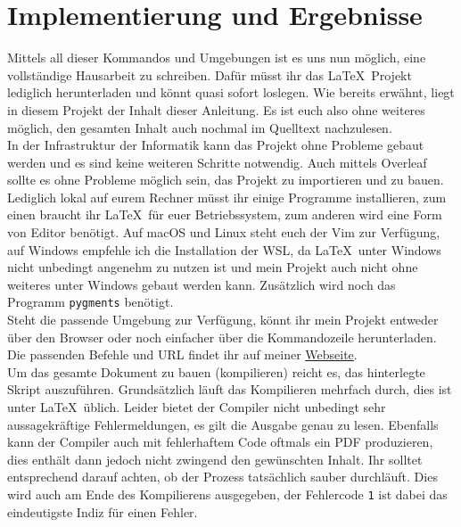 \section{Implementierung und Ergebnisse}

Mittels all dieser Kommandos und Umgebungen ist es uns nun möglich, eine
vollständige Hausarbeit zu schreiben. Dafür müsst ihr das \LaTeX~Projekt 
lediglich herunterladen und könnt quasi sofort loslegen. Wie bereits erwähnt,
liegt in diesem Projekt der Inhalt dieser Anleitung. Es ist euch also ohne 
weiteres möglich, den gesamten Inhalt auch nochmal im Quelltext nachzulesen.\\
In der Infrastruktur der Informatik kann das Projekt ohne Probleme gebaut 
werden und es sind keine weiteren Schritte notwendig. Auch mittels Overleaf
sollte es ohne Probleme möglich sein, das Projekt zu importieren und zu bauen. 
Lediglich lokal auf eurem Rechner müsst ihr einige Programme installieren, zum 
einen braucht ihr \LaTeX~für euer Betriebssystem, zum anderen wird eine Form 
von Editor benötigt. Auf macOS und Linux steht euch der Vim zur Verfügung, auf
Windows empfehle ich die Installation der WSL, da \LaTeX~unter Windows nicht 
unbedingt angenehm zu nutzen ist und mein Projekt auch nicht ohne weiteres unter
Windows gebaut werden kann. Zusätzlich wird noch das Programm \texttt{pygments} 
benötigt.\\
Steht die passende Umgebung zur Verfügung, könnt ihr mein Projekt entweder über 
den Browser oder noch einfacher über die Kommandozeile herunterladen. Die passenden
Befehle und URL findet ihr auf meiner 
\href{https://informatik.hs-bremerhaven.de/flignitz/latex.html}{Webseite}.\\
Um das gesamte Dokument zu bauen (kompilieren) reicht es, das hinterlegte Skript
auszuführen. Grundsätzlich läuft das Kompilieren mehrfach durch, dies ist unter 
\LaTeX~üblich. Leider bietet der Compiler nicht unbedingt sehr aussagekräftige 
Fehlermeldungen, es gilt die Ausgabe genau zu lesen. Ebenfalls kann der Compiler auch
mit fehlerhaftem Code oftmals ein PDF produzieren, dies enthält dann jedoch nicht 
zwingend den gewünschten Inhalt. Ihr solltet entsprechend darauf achten, ob der 
Prozess tatsächlich sauber durchläuft. Dies wird auch am Ende des Kompilierens 
ausgegeben, der Fehlercode \texttt{1} ist dabei das eindeutigste Indiz für einen
Fehler.
